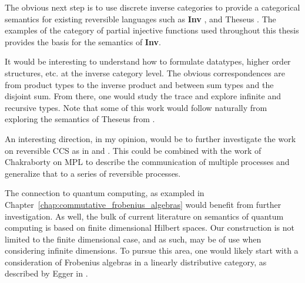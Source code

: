 The obvious next step is to use discrete inverse categories to provide a categorical semantics for
existing reversible languages such as \textbf{Inv} \cite{muetal04:injreversible}, and Theseus
\cite{james2013isomorphic,james2012information}. The examples of the category of partial injective
functions used throughout this thesis provides the basis for the semantics of \textbf{Inv}.

It would be interesting to understand how to formulate datatypes, higher order structures, etc. at the
inverse category level. The obvious correspondences are from product types to the inverse product and
between sum types and the disjoint sum. From there, one would study the trace and explore infinite
and recursive types. Note that some of this work would follow naturally from exploring the semantics
of Theseus from \cite{james2013isomorphic,james2012information}.

An interesting direction, in my opinion, would be to further investigate the work on reversible
CCS as in \cite{danos2004reversible} and \cite{phillips2006operational}. This could be combined with
the work of Chakraborty on MPL \cite{chakraborty2014} to describe the communication of multiple
processes and generalize that to a series of reversible processes.


The connection to quantum computing, as exampled in
Chapter~\ref{chap:commutative_frobenius_algebras} would benefit from further investigation. As well,
the bulk of current literature on semantics of quantum computing is based on finite dimensional
Hilbert spaces. Our construction is not limited to the finite dimensional
case, and as such, may be of use when considering infinite dimensions. To pursue this area, one
would likely start with a consideration of Frobenius algebras in a linearly distributive category,
as described by Egger in \cite{egger2010frobenius}.


